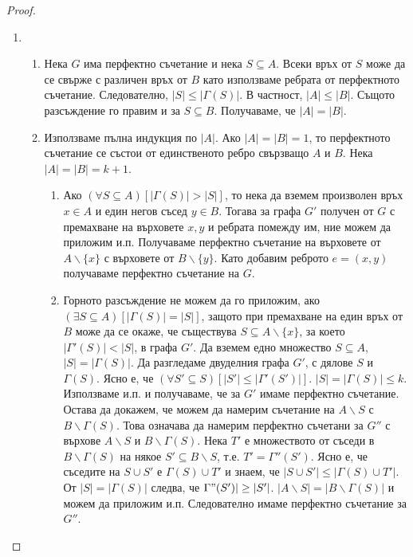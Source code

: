 \begin{proof}
\begin{enumerate}
  \item
    \begin{enumerate}
    \item
      Нека $G$ има перфектно съчетание и нека $S\subseteq A$.
      Всеки връх от $S$ може да се свърже с различен връх от $B$ като използваме ребрата от перфектното съчетание.
      Следователно, $|S| \leq |\Gamma(S)|$. В частност, $|A| \leq |B|$.
      Същото разсъждение го правим и за $S\subseteq B$.
      Получаваме, че $|A| = |B|$.    
    \item
      Използваме пълна индукция по $|A|$.
      Ако $|A| = |B| = 1$, то перфектното съчетание се състои от единственото ребро свързващо $A$ и $B$.
      Нека $|A| = |B| = k+1$.
      \begin{enumerate}
      \item
        Ако $(\forall S\subseteq A)[|\Gamma(S)| > |S|]$, то нека да вземем произволен връх $x\in A$ и един негов съсед $y\in B$.
        Тогава за графа $G'$ получен от $G$ с премахване на върховете $x,y$ и ребрата помежду им, ние можем да приложим и.п.
        Получаваме перфектно съчетание на върховете от $A\backslash\{x\}$ с върховете от $B\backslash\{y\}$.
        Като добавим реброто $e = (x,y)$ получаваме перфектно съчетание на $G$.
      \item
        Горното разсъждение не можем да го приложим, ако $(\exists S\subseteq A)[|\Gamma(S)| = |S|]$, защото при премахване на един връх от $B$ 
        може да се окаже, че съществува $S\subseteq A\backslash\{x\}$, за което $|\Gamma'(S)| < |S|$, в графа $G'$.
        Да вземем едно множество $S\subseteq A$, $|S| = |\Gamma(S)|$.
        Да разгледаме двуделния графа $G'$, с дялове $S$ и $\Gamma(S)$.
        Ясно е, че $(\forall S'\subseteq S)[|S'| \leq |\Gamma'(S')|]$.
        $|S| = |\Gamma(S)| \leq k$.
        Използваме и.п. и получаваме, че за $G'$ имаме перфектно съчетание.
        Остава да докажем, че можем да намерим съчетание на $A\backslash S$ с $B\backslash \Gamma(S)$.
        Това означава да намерим перфектно съчетани за $G''$ с върхове $A\backslash S$ и $B\backslash \Gamma(S)$.
        Нека $T'$ е множеството от съседи в $B\backslash \Gamma(S)$ на някое $S'\subseteq B\backslash S$, 
        т.е. $T' = \Gamma''(S')$.
        Ясно е, че съседите на $S\cup S'$ е $\Gamma(S)\cup T'$ и знаем, че $|S\cup S'| \leq |\Gamma(S)\cup T'|$.
        От $|S| = |\Gamma(S)|$ следва, че $\Gamma"(S')|\geq |S'|$.
        $|A\backslash S| = |B\backslash \Gamma(S)|$ и можем да приложим и.п.
        Следователно имаме перфектно съчетание за $G''$.      
      \end{enumerate}
      
    \end{enumerate}
  \end{enumerate}
\end{proof}


